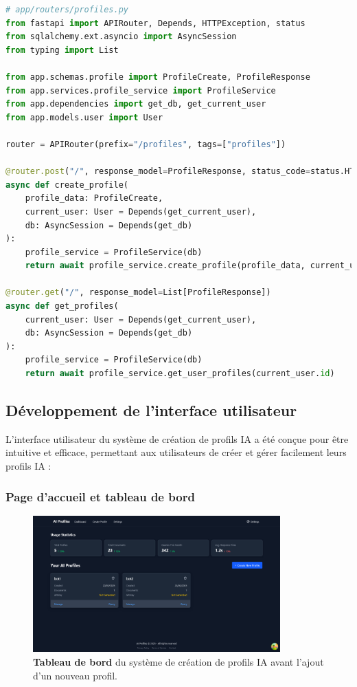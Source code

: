 \begin{lstlisting}[style=codestyle, language=Python]
# app/routers/profiles.py
from fastapi import APIRouter, Depends, HTTPException, status
from sqlalchemy.ext.asyncio import AsyncSession
from typing import List

from app.schemas.profile import ProfileCreate, ProfileResponse
from app.services.profile_service import ProfileService
from app.dependencies import get_db, get_current_user
from app.models.user import User

router = APIRouter(prefix="/profiles", tags=["profiles"])

@router.post("/", response_model=ProfileResponse, status_code=status.HTTP_201_CREATED)
async def create_profile(
    profile_data: ProfileCreate,
    current_user: User = Depends(get_current_user),
    db: AsyncSession = Depends(get_db)
):
    profile_service = ProfileService(db)
    return await profile_service.create_profile(profile_data, current_user.id)

@router.get("/", response_model=List[ProfileResponse])
async def get_profiles(
    current_user: User = Depends(get_current_user),
    db: AsyncSession = Depends(get_db)
):
    profile_service = ProfileService(db)
    return await profile_service.get_user_profiles(current_user.id)
\end{lstlisting}

\subsection{Développement de l'interface utilisateur}

L'interface utilisateur du système de création de profils IA a été conçue pour être intuitive et efficace, permettant aux utilisateurs de créer et gérer facilement leurs profils IA :

\subsubsection{Page d'accueil et tableau de bord}

\begin{figure}[H]
  \centering
  \includegraphics[width=0.85\textwidth,keepaspectratio]{pfe-pics/ai-profile-creation/dashboared_befor_adding_a_new_ai_profile.png}
  \caption{\textbf{Tableau de bord} du système de création de profils IA avant l'ajout d'un nouveau profil.}
  \label{fig:ai_dashboard}
\end{figure}

